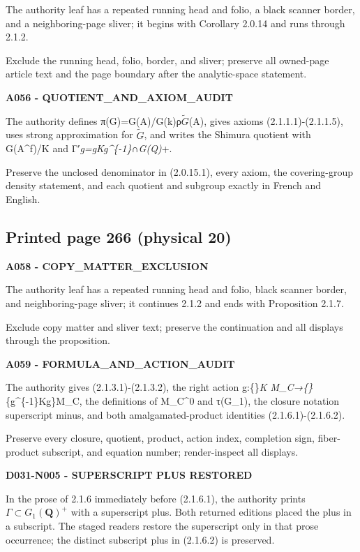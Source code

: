 \documentclass[10pt,a4paper]{article}
\begin{document}
The authority leaf has a repeated running head and folio, a black scanner border, and a neighboring-page sliver; it begins with Corollary 2.0.14 and runs through 2.1.2.

Exclude the running head, folio, border, and sliver; preserve all owned-page article text and the page boundary after the analytic-space statement.

\textbf{A056 - QUOTIENT\_AND\_AXIOM\_AUDIT}

The authority defines π(G)=G(A)/G(k)ρ\(\widetilde{G}\)(A), gives axioms (2.1.1.1)-(2.1.1.5), uses strong approximation for \(\widetilde{G}\), and writes the Shimura quotient with G(A\^{}f)/K and Γ′\emph{g=gKg\^{}\{-1\}∩G(Q)}+.

Preserve the unclosed denominator in (2.0.15.1), every axiom, the covering-group density statement, and each quotient and subgroup exactly in French and English.

\subsection{Printed page 266 (physical 20)}

\textbf{A058 - COPY\_MATTER\_EXCLUSION}

The authority leaf has a repeated running head and folio, black scanner border, and neighboring-page sliver; it continues 2.1.2 and ends with Proposition 2.1.7.

Exclude copy matter and sliver text; preserve the continuation and all displays through the proposition.

\textbf{A059 - FORMULA\_AND\_ACTION\_AUDIT}

The authority gives (2.1.3.1)-(2.1.3.2), the right action g:\{\}\emph{K M\_C→\{\}}\{g\^{}\{-1\}Kg\}M\_C, the definitions of M\_C\^{}0 and τ(G\_1), the closure notation superscript minus, and both amalgamated-product identities (2.1.6.1)-(2.1.6.2).

Preserve every closure, quotient, product, action index, completion sign, fiber-product subscript, and equation number; render-inspect all displays.

\textbf{D031-N005 - SUPERSCRIPT PLUS RESTORED}

In the prose of 2.1.6 immediately before (2.1.6.1), the authority prints \(\Gamma\subset G_1(\mathbf Q)^+\) with a superscript plus. Both returned editions placed the plus in a subscript. The staged readers restore the superscript only in that prose occurrence; the distinct subscript plus in (2.1.6.2) is preserved.
\end{document}
